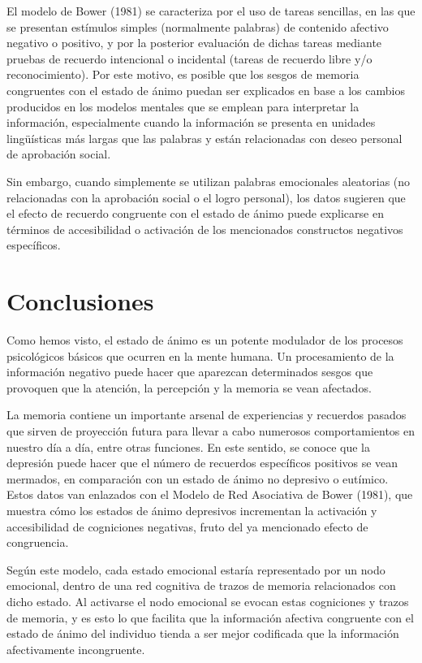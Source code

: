 \documentclass[a4paper,11pt]{article}
\begin{document}
El modelo de Bower (1981) se caracteriza por el uso de tareas sencillas, en las que se presentan estímulos simples (normalmente palabras) de contenido afectivo negativo o positivo, y por la posterior evaluación de dichas tareas mediante pruebas de recuerdo intencional o incidental (tareas de recuerdo libre y/o reconocimiento). Por este motivo, es posible que los sesgos de memoria congruentes con el estado de ánimo puedan ser explicados en base a los cambios producidos en los modelos mentales que se emplean para interpretar la información, especialmente cuando la información se presenta en unidades lingüísticas más largas que las palabras y están relacionadas con deseo personal de aprobación social. 

Sin embargo, cuando simplemente se utilizan palabras emocionales aleatorias (no relacionadas con la aprobación social o el logro personal), los datos sugieren que el efecto de recuerdo congruente con el estado de ánimo puede explicarse en términos de accesibilidad o activación de los mencionados constructos negativos específicos.

\section{Conclusiones}
Como hemos visto, el estado de ánimo es un potente modulador de los procesos psicológicos básicos que ocurren en la mente humana. Un procesamiento de la información negativo puede hacer que aparezcan determinados sesgos que provoquen que la atención, la percepción y la memoria se vean afectados. 

La memoria contiene un importante arsenal de experiencias y recuerdos pasados que sirven de proyección futura para llevar a cabo numerosos comportamientos en nuestro día a día, entre otras funciones. En este sentido, se conoce que la depresión puede hacer que el número de recuerdos específicos positivos se vean mermados, en comparación con un estado de ánimo no depresivo o eutímico. Estos datos van enlazados con el Modelo de Red Asociativa de Bower (1981), que muestra cómo los estados de ánimo depresivos incrementan la activación y accesibilidad de cogniciones negativas, fruto del ya mencionado efecto de congruencia.

Según este modelo, cada estado emocional estaría representado por un nodo emocional, dentro de una red cognitiva de trazos de memoria relacionados con dicho estado. Al activarse el nodo emocional se evocan estas cogniciones y trazos de memoria, y es esto lo que facilita que la información afectiva congruente con el estado de ánimo del individuo tienda a ser mejor codificada que la información afectivamente incongruente. 
\end{document}

